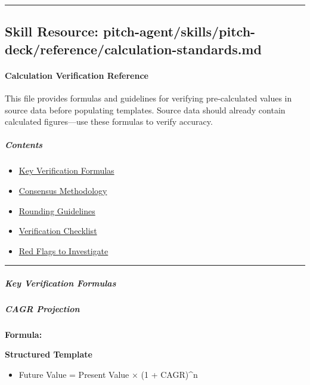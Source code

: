 \documentclass[11pt]{article}
\begin{document}
\vspace{0.8em}\hrule\vspace{0.8em}

\subsection{Skill Resource: pitch-agent/skills/pitch-deck/reference/calculation-standards.md}\label{file:pitch-agent-skills-pitch-deck-reference-calculation-standards-md}

\paragraph{Calculation Verification Reference}\mbox{}\par

This file provides formulas and guidelines for verifying pre-calculated values in source data before populating templates. Source data should already contain calculated figures—use these formulas to verify accuracy.


\subparagraph{Contents}\mbox{}\par

\begin{itemize}[leftmargin=*,itemsep=2pt,topsep=2pt]
\item {} \href{\#key-verification-formulas}{Key Verification Formulas}
\item {} \href{\#consensus-methodology}{Consensus Methodology}
\item {} \href{\#rounding-guidelines}{Rounding Guidelines}
\item {} \href{\#verification-checklist}{Verification Checklist}
\item {} \href{\#red-flags-to-investigate}{Red Flags to Investigate}
\end{itemize}

\vspace{0.5em}\hrule\vspace{0.5em}

\subparagraph{Key Verification Formulas}\mbox{}\par

\subparagraph{CAGR Projection}\mbox{}\par

\textbf{Formula:}

\textbf{Structured Template}
\begin{itemize}[leftmargin=*,itemsep=2pt,topsep=2pt]
\item {} Future Value = Present Value × (1 + CAGR)\textasciicircum{}n
\end{itemize}
\end{document}
